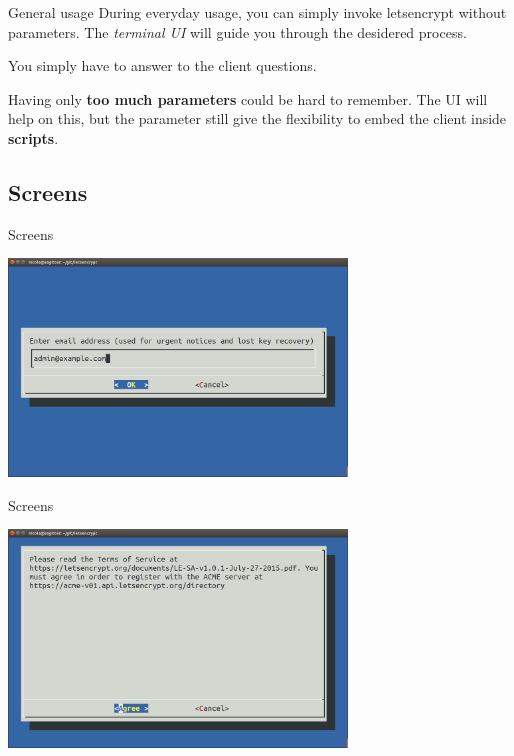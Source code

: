 \documentclass[xcolor=svgnames,11pt]{beamer}
\begin{document}
\begin{frame}[fragile]{General usage}
During everyday usage, you can simply invoke letsencrypt without parameters. The \emph{terminal UI} will guide you through the desidered process.

\medskip\pause

You simply have to answer to the client questions.

\medskip\pause

Having only \textbf{too much parameters} could be hard to remember. The UI will help on this, but the parameter still give the flexibility to embed the client inside \textbf{scripts}.

\end{frame}

\subsection{Screens}
\begin{frame}{Screens}
\begin{center}
\includegraphics[width=9cm]{img/screen1.png}
\end{center}
\end{frame}
\begin{frame}{Screens}
\begin{center}
\includegraphics[width=9cm]{img/screen2.png}
\end{center}
\end{frame}
\end{document}
